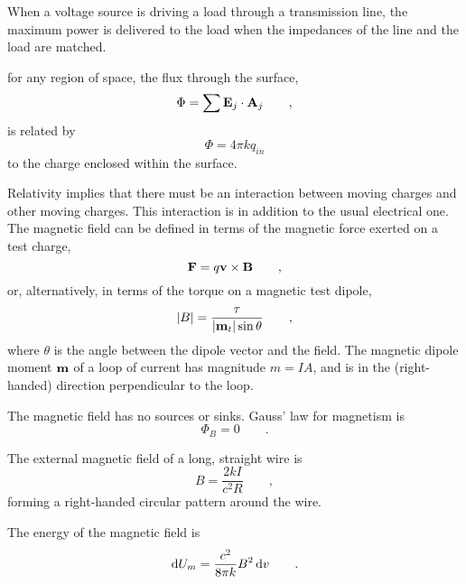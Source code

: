 	When a voltage source is driving a load through a transmission line, the maximum
	power is delivered to the load when the impedances of the line and the load
	are matched.
	
	for any region of space, the flux through the surface,
	\begin{equation*}
		\Phi = \sum \mathbf{E}_j\cdot\mathbf{A}_j \qquad ,
	\end{equation*}
	is related by
	\begin{equation*}
		\Phi = 4\pi kq_{in}
	\end{equation*}
	to the charge enclosed within the surface.

	Relativity implies that there must be an interaction between
	moving charges and other moving charges. This  interaction
	is in addition to the usual electrical one.
	The magnetic field can be defined in terms of the magnetic force
	exerted on a test charge,
	\begin{equation*}
		\mathbf{F} = q\mathbf{v}\times\mathbf{B} \qquad ,
	\end{equation*}
	or, alternatively, in terms of the torque on a magnetic test dipole,
	\begin{equation*}
		|B| = \frac{\tau}{|\mathbf{m}_{t}|\sin\theta}  \qquad,
	\end{equation*}
	where $\theta$ is the angle between the dipole vector and the field.	
	The magnetic dipole moment $\mathbf{m}$ of a loop of current has magnitude
	$m=IA$, and is in the (right-handed) direction perpendicular to the loop.

	The magnetic field has no sources or sinks. Gauss' law for
	magnetism is
	\begin{equation*}
		\Phi_B = 0 \qquad .
	\end{equation*}
	
	The external magnetic field of a long, straight wire is
	\begin{equation*}
		B	= \frac{2kI}{c^2R} \qquad ,
	\end{equation*}
	forming a right-handed circular pattern around the wire.
	
	The energy of the magnetic field is
	\begin{equation*}
		\operatorname{d\!} U_m	= 		\frac{c^2}{8\pi k}B^2 \operatorname{d\!} v \qquad .
	\end{equation*}

